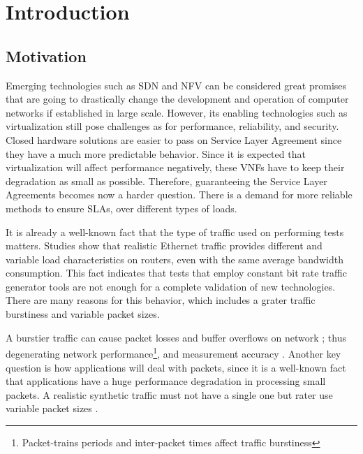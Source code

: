 \chapter{Introduction}\label{ch:introduction}

\section{Motivation}
 

Emerging technologies such as SDN and NFV can be considered great promises that are going to  drastically change the development and operation of computer networks if established in large scale. However, its enabling technologies such as virtualization still pose challenges as for performance,  reliability, and security\cite{nfv-challenges}. Closed hardware solutions are easier to pass on Service Layer Agreement since they have a much more predictable behavior. Since it is expected that virtualization will affect performance negatively, these VNFs have to keep their degradation as small as possible. Therefore, guaranteeing the Service Layer Agreements becomes now a harder question. There is a demand for more reliable methods to ensure SLAs, over different types of loads.


It is already a well-known fact that the type of traffic used on performing tests matters. Studies show that  realistic Ethernet traffic provides different and variable load characteristics on routers\cite{harpoon-validation}, even with the same average bandwidth consumption. This fact indicates that tests that employ constant bit rate traffic generator tools are not enough for a complete validation of new technologies. There are many reasons for this behavior, which includes a grater traffic burstiness and variable packet sizes.


A burstier traffic can cause packet losses and buffer overflows on network \cite{burstiness-queue-lenght} \cite{modelling-of-self-similar} \cite{empirical-interarrival-study}; thus degenerating network performance\footnote{Packet-trains periods and inter-packet times affect traffic burstiness}, and  measurement accuracy\cite{legotg-paper} \cite{background-traffic-matter}. Another key question is how applications will deal with packets, since it is a well-known fact that applications have a huge performance degradation in processing small packets\cite{comparative-trafficgen-tools}. A realistic synthetic traffic must not have a single one but rater use variable packet sizes \cite{packet-distribution-model}. 


